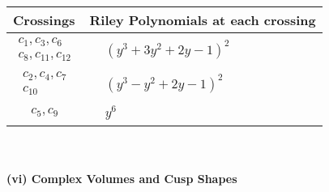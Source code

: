 \documentclass[1p]{elsarticle_modified}
\theoremstyle{definition}
\begin{document}
\begin{tabular}{m{50pt}|m{274pt}}
Crossings & \hspace{64pt}Riley Polynomials at each crossing \\
\hline $$\begin{aligned}c_{1},c_{3},c_{6}\\c_{8},c_{11},c_{12}\end{aligned}$$&$\begin{aligned}
&(y^3+3 y^2+2 y-1)^2
\end{aligned}$\\
\hline $$\begin{aligned}c_{2},c_{4},c_{7}\\c_{10}\end{aligned}$$&$\begin{aligned}
&(y^3- y^2+2 y-1)^2
\end{aligned}$\\
\hline $$\begin{aligned}c_{5},c_{9}\end{aligned}$$&$\begin{aligned}
&y^6
\end{aligned}$\\
\hline
\end{tabular}\\~\\
\newpage\flushleft \textbf{(vi) Complex Volumes and Cusp Shapes}
\end{document}
